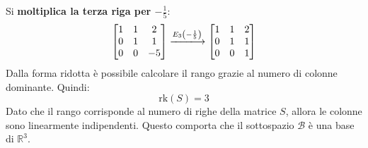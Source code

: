 \documentclass[a4paper]{article}
\begin{document}
	Si \textbf{moltiplica la terza riga per $-\frac{1}{5}$}:
	\begin{equation*}
		\begin{bmatrix}
			1 & 1 & 2 \\
			0 & 1 & 1 \\
			0 & 0 & -5
		\end{bmatrix} \xlongrightarrow{E_{3}\left(-\frac{1}{5}\right)} \begin{bmatrix}
			1 & 1 & 2 \\
			0 & 1 & 1 \\
			0 & 0 & 1
		\end{bmatrix}
	\end{equation*}
	Dalla forma ridotta è possibile calcolare il rango grazie al numero di colonne dominante. Quindi:
	\begin{equation*}
		\mathrm{rk}\left(S\right) = 3
	\end{equation*}
	Dato che il rango corrisponde al numero di righe della matrice $S$, allora le colonne sono linearmente indipendenti. Questo comporta che il sottospazio $\mathcal{B}$ è una base di $\mathbb{R}^{3}$.\newline
	
\end{document}

